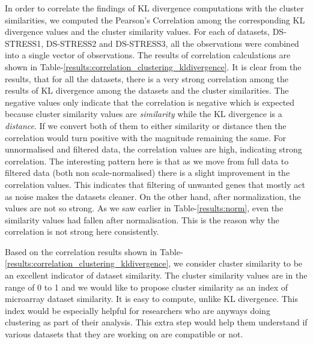 In order to correlate the findings of \ac{KL} divergence computations with the cluster similarities, we computed the Pearson's Correlation among the corresponding KL divergence values and the cluster similarity values. For each of datasets, DS-STRESS1, DS-STRESS2 and DS-STRESS3, all the observations were combined into a single vector of observations. The results of correlation calculations are shown in Table-\ref{results:correlation_clustering_kldivergence}. It is clear from the results, that for all the datasets, there is a very strong correlation among the results of KL divergence among the datasets and the cluster similarities. The negative values only indicate that the correlation is negative which is expected because cluster similarity values are \textit{similarity} while the KL divergence is a \textit{distance}. If we convert both of them to either similarity or distance then the correlation would turn positive with the magnitude remaining the same. For unnormalised and filtered data, the correlation values are high, indicating strong correlation. The interesting pattern here is that as we move from full data to filtered data (both non scale-normalised) there is a slight improvement in the correlation values. This indicates that filtering of unwanted genes that mostly act as noise makes the datasets cleaner. On the other hand, after normalization, the values are not so strong. As we saw earlier in Table-\ref{results:norm}, even the similarity values had fallen after normalisation. This is the reason why the correlation is not strong here consistently.

Based on the correlation results shown in Table-\ref{results:correlation_clustering_kldivergence}, we consider cluster similarity to be an excellent indicator of dataset similarity. The cluster similarity values are in the range of 0 to 1 and we would like to propose cluster similarity as an index of microarray dataset similarity. It is easy to compute, unlike KL divergence. This index would be especially helpful for researchers who are anyways doing clustering as part of their analysis. This extra step would help them understand if various datasets that they are working on are compatible or not.

